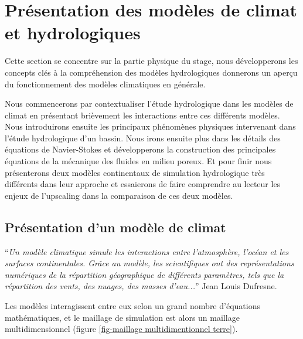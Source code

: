 \documentclass[a4paper,11pt]{article}
\numberwithin{equation}{section}
\begin{document}
\newpage
\section{Présentation des modèles de climat et hydrologiques}
\label{ch:presentation modele climat}

Cette section se concentre sur la partie physique du stage, nous développerons les concepts clés à la compréhension des modèles hydrologiques donnerons un aperçu du fonctionnement des modèles climatiques en générale. 

\vspace{0.7cm}

Nous commencerons par contextualiser l'étude hydrologique dans les modèles de climat en présentant brièvement les interactions entre ces différents modèles. Nous introduirons ensuite les principaux phénomènes physiques intervenant dans l'étude hydrologique d'un bassin. Nous irons ensuite plus dans les détails des équations de Navier-Stokes et développerons la construction des principales équations de la mécanique des fluides en milieu poreux. Et pour finir nous présenterons deux modèles continentaux de simulation hydrologique très différents dans leur approche et essaierons de faire comprendre au lecteur les enjeux de l'upscaling dans la comparaison de ces deux modèles.

\subsection{Présentation d'un modèle de climat}
\label{modeles de climat/ concepts hydro}

``\textit{Un modèle climatique simule les interactions entre l'atmosphère, l'océan et les surfaces continentales. Grâce au modèle, les scientifiques ont des représentations numériques de la répartition géographique de différents paramètres, tels que la répartition des vents, des nuages, des masses d'eau...}'' Jean Louis Dufresne.

Les modèles interagissent entre eux selon un grand nombre d'équations mathématiques, et le maillage de simulation est alors un maillage multidimensionnel (figure \ref{fig-maillage multidimentionnel terre}). 
\end{document}
